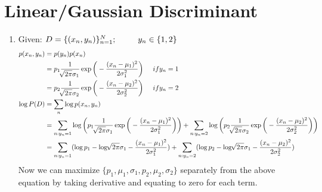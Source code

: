 \documentclass[12pt]{article}
\begin{document}
\section{Linear/Gaussian Discriminant}
\begin{enumerate}[label=\alph*.]
\item 
Given: $D = \{ (x_n,y_n)\}_{n=1}^N; \hspace{9mm} y_n \in \{1,2\} $
\begin{align}
p(x_n,y_n) &= p(y_n) p(x_n)\\
&= p_1 \frac{1}{\sqrt[]{2\pi}\sigma_1} \exp\bigg( - \frac{(x_n-\mu_1)^2}{2\sigma_1^2}\bigg) \hspace{5mm}if y_n =1\\
&= p_2 \frac{1}{\sqrt[]{2\pi}\sigma_2} \exp\bigg( - \frac{(x_n-\mu_2)^2}{2\sigma_2^2}\bigg) \hspace{5mm}if y_n =2\\
\log P(D) &= \sum_n \log p(x_n,y_n)\\
&= \sum_{n:y_n=1} \log \bigg( p_1 \frac{1}{\sqrt[]{2\pi}\sigma_1} \exp\bigg( - \frac{(x_n-\mu_1)^2}{2\sigma_1^2}\bigg) \bigg) +\sum_{n:y_n=2} \log \bigg( p_2 \frac{1}{\sqrt[]{2\pi}\sigma_2} \exp\bigg( - \frac{(x_n-\mu_2)^2}{2\sigma_2^2}\bigg) \bigg)\\
&= \sum_{n:y_n=1} (\log p_1 - \log \sqrt[]{2\pi}\sigma_1 - \frac{(x_n-\mu_1)^2}{2\sigma_1^2} ) + \sum_{n:y_n=2} (\log p_2 - \log \sqrt[]{2\pi}\sigma_1 - \frac{(x_n-\mu_2)^2}{2\sigma_2^2} )
\end{align}
Now we can maximize $\{p_1,\mu_1,\sigma_1, p_2,\mu_2,\sigma_2\}$ separately from the above equation by taking derivative and equating to zero for each term.\\


\end{enumerate}
\end{document}
